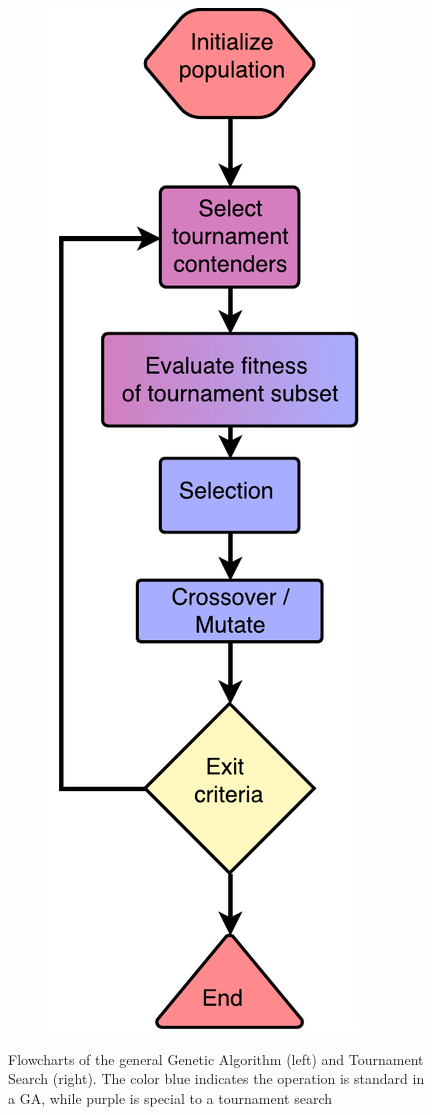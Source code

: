 \begin{figure}[h]
\begin{subfigure}[h]{0.25\linewidth}
    \end{subfigure}
    \hspace{0.25\textwidth}
    \begin{subfigure}[h]{0.25\linewidth}
        \includegraphics[width=\linewidth]{Chapters/Background/figures/tournamentsearch_flowchart.pdf}
    \end{subfigure}
    \caption{Flowcharts of the general Genetic Algorithm (left) and Tournament Search (right). The color blue indicates the operation is standard in a GA, while purple is special to a tournament search}
    \label{fig:algorithmflowcharts}
\end{figure}


